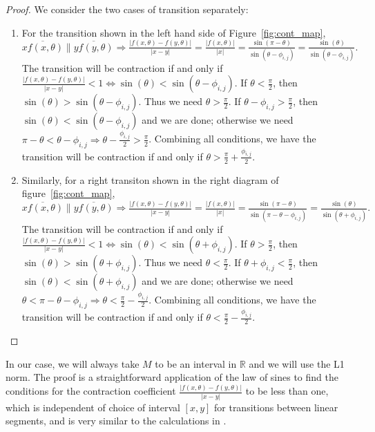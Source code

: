 \documentclass[]{article}
\begin{document}
\begin{proof}
We consider the two cases of transition separately:
\begin{enumerate}
    \item For the transition shown in the left hand side of Figure~\ref{fig:cont_map}, 
          $\overline{xf(x, \theta)} \parallel \overline{yf(y, \theta)} \Rightarrow \frac{|f(x, \theta)-f(y, \theta)|}{|x-y|} = \frac{|f(x, \theta)|}{|x|} = \frac{\sin(\pi - \theta)}{\sin(\theta - \phi_{i, j})} = \frac{\sin(\theta)}{\sin(\theta-\phi_{i, j})}.$ The transition will be contraction if and only if $\frac{|f(x, \theta)-f(y, \theta)|}{|x-y|} < 1 \iff \sin(\theta)<\sin(\theta-\phi_{i, j})$. If $\theta < \frac{\pi}{2}$, then $\sin(\theta) > \sin(\theta-\phi_{i, j})$. Thus we need $\theta>\frac{\pi}{2}$. If $\theta-\phi_{i, j} > \frac{\pi}{2}$, then $\sin(\theta) < \sin(\theta-\phi_{i, j})$ and we are done; otherwise we need $\pi - \theta < \theta-\phi_{i, j} \Rightarrow \theta - \frac{\phi_{i, j}}{2} > \frac{\pi}{2}$. Combining all conditions, we have the transition will be contraction if and only if $\theta >\frac{\pi}{2} + \frac{\phi_{i, j}}{2}$.
    \item Similarly, for a right transiton shown in the right diagram of figure~\ref{fig:cont_map}, $\overline{xf(x, \theta)} \parallel \overline{yf(y, \theta)} \Rightarrow \frac{|f(x, \theta)-f(y, \theta)|}{|x-y|} = \frac{|f(x, \theta)|}{|x|} = \frac{\sin(\pi - \theta)}{\sin(\pi -\theta-\phi_{i, j})} = \frac{\sin(\theta)}{\sin(\theta + \phi_{i, j})}.$ The transition will be contraction if and only if $\frac{|f(x, \theta)-f(y, \theta)|}{|x-y|} < 1 \iff \sin(\theta)<\sin(\theta+\phi_{i, j})$. If $\theta  > \frac{\pi}{2}$, then $\sin(\theta) > \sin(\theta + \phi_{i, j})$. Thus we need $\theta<\frac{\pi}{2}$. If $\theta+\phi_{i, j} < \frac{\pi}{2}$, then $\sin(\theta) < \sin(\theta+\phi_{i, j})$ and we are done; otherwise we need $\theta < \pi-\theta-\phi_{i, j} \Rightarrow \theta < \frac{\pi}{2} - \frac{\phi_{i, j}}{2}$. Combining all conditions, we have the transition will be contraction if and only if $\theta <\frac{\pi}{2} - \frac{\phi_{i, j}}{2}$.
\end{enumerate}

\end{proof}

In our case, we will always take $M$ to be an interval in $\mathbb{R}$ and we
will use the L1 norm. The proof is a straightforward application of the law of
sines to find the conditions for the contraction coefficient $\frac{ | f(x,\theta)-f(y,\theta)
|}{|x-y|}$ to be less than one, which is independent of choice of interval $[x, y]$ for transitions between linear
segments, and is very similar to the calculations in \cite{NilBecLav17}.
\end{document}
